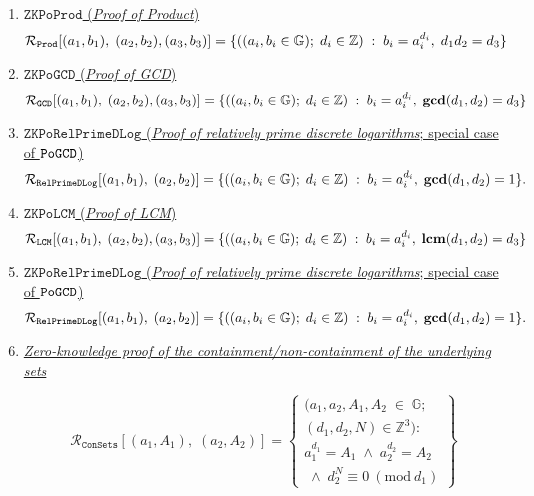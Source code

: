 \documentclass[11pt, lettersize, notitlepage, leqno, footskip=0.6cm]{article}
\newcommand{\bz}{\mathbb Z}
\newcommand{\ttt}{\texttt}
\newcommand{\sett}{\ttt{Set}}
\newcommand{\mc}{\mathcal}
\newcommand{\mb}{\mathbb}
\newcommand{\mbf}{\mathbf}
\newcommand{\sub}{\subseteq}
\newcommand{\mcM}{\mc{M}}
\newcommand{\vs}{\vspace{-0.15cm}}
\newcommand{\noin}{\noindent}
\newcommand{\Mod}[1]{\ (\mathrm{mod}\ #1)}
\newcommand{\LCM}{\mbf{lcm}}
\newcommand{\GCD}{\mbf{gcd}}
\numberwithin{equation}{section}
\begin{document}
{{{\begin{enumerate}[wide, labelwidth=!, labelindent=0pt]
\item \hyperlink{GCD}{$\ttt{ZKPoProd}$ (\textit{Proof of Product})} \vspace{-0.15cm} $$\mc{R}_{{\ttt{Prod}}}[(a_1,b_1),\; (a_2,b_2),(a_3,b_3)] = \{((a_i, b_i\in\mb{G});\;d_i\in\bz)\;:\; b_i = a_i^{d_i},\;d_1d_2 = d_3  \} \vs $$


\item \hyperlink{GCD}{$\ttt{ZKPoGCD}$ (\textit{Proof of GCD})} \vspace{-0.15cm} $$\mc{R}_{{\ttt{GCD}}}[(a_1,b_1),\; (a_2,b_2),(a_3,b_3)] = \{((a_i, b_i\in\mb{G});\;d_i\in\bz)\;:\; b_i = a_i^{d_i},\;\GCD(d_1,d_2)=d_3  \} \vs $$


\item \hyperlink{RP}{$\ttt{ZKPoRelPrimeDLog}$ (\textit{Proof of relatively prime discrete logarithms}; special case of $\tt{PoGCD}$)} \vs $$ \mc{R}_{\ttt{RelPrimeDLog}}[(a_1,b_1),\;(a_2,b_2)] = \{((a_i, b_i\in\mb{G});\;d_i\in\bz)\;:\; b_i = a_i^{d_i},\;\GCD(d_1,d_2)=1 \} . \vs $$


\item \hyperlink{LCM}{$\ttt{ZKPoLCM}$ (\textit{Proof of LCM})} \vspace{-0.15cm} $$\mc{R}_{{\ttt{LCM}}}[(a_1,b_1),\; (a_2,b_2),(a_3,b_3)] = \{((a_i, b_i\in\mb{G});\;d_i\in\bz)\;:\; b_i = a_i^{d_i},\;\LCM(d_1,d_2)=d_3  \} \vs $$


\item \hyperlink{RP}{$\ttt{ZKPoRelPrimeDLog}$ (\textit{Proof of relatively prime discrete logarithms}; special case of $\tt{PoGCD}$)} \vs $$ \mc{R}_{\ttt{RelPrimeDLog}}[(a_1,b_1),\;(a_2,b_2)] = \{((a_i, b_i\in\mb{G});\;d_i\in\bz)\;:\; b_i = a_i^{d_i},\;\GCD(d_1,d_2)=1 \} . \vs $$


\item \hyperlink{Sets}{\textit{Zero-knowledge proof of the containment/non-containment of the underlying sets}}\vspace{-0.3cm}


\[
  \mc{R}_{\ttt{ConSets}}[(a_1, A_1),\;(a_2,A_2)] = \left\{\begin{array}{l}
    (a_1,a_2, A_1, A_2\;\in\;\mb{G}; \\
    (d_1, d_2, N) \in \bz^3):   \\
    a_1^{d_1} = A_1\;\wedge\;a_2^{d_2} = A_2\\
    \;\wedge\;d_2^{N}\equiv 0\Mod{d_1} 
  \end{array}\right\}
\]



\end{enumerate}}}}
\end{document}
